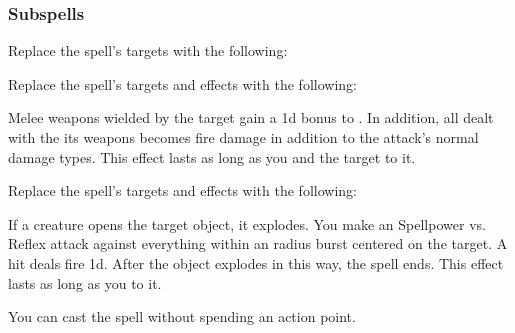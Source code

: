 \subsubsection{Subspells}
Replace the spell's targets with the following:
\begin{spellcontent}
\begin{augmenttargetinginfo}
\end{augmenttargetinginfo}
\end{spellcontent}
Replace the spell's targets and effects with the following:
\begin{spellcontent}
\begin{augmenttargetinginfo}
\end{augmenttargetinginfo}
\begin{augmenteffects}
\spelleffect
Melee weapons wielded by the target gain a \plus1d bonus to .
In addition, all  dealt with the its weapons becomes fire damage in addition to the attack's normal damage types.
This effect lasts as long as you and the target  to it.
\end{augmenteffects}
\end{spellcontent}
Replace the spell's targets and effects with the following:
\begin{spellcontent}
\begin{augmenttargetinginfo}
\end{augmenttargetinginfo}
\begin{augmenteffects}
\spelleffect
If a creature opens the target object, it explodes.
You make an Spellpower vs. Reflex attack against everything within an \areamed radius burst centered on the target.
A hit deals fire  \minus1d.
After the object explodes in this way, the spell ends.
This effect lasts as long as you  to it.
\end{augmenteffects}
\end{spellcontent}
You can cast the spell without spending an action point.
